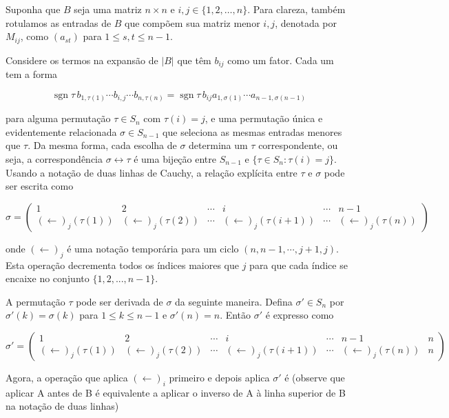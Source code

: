 
Suponha que $B$ seja uma matriz $n \times n$ e $i,j \in \{1,2,\dots ,n\}$. Para clareza, também rotulamos as entradas de $B$ que compõem sua matriz menor $i,j$, denotada por $M_{ij}$, como $(a_{st})$ para $1 \leq s,t \leq n-1$.

Considere os termos na expansão de $|B|$ que têm $b_{ij}$ como um fator. Cada um tem a forma

\[
\operatorname{sgn} \tau \, b_{1,\tau (1)}\cdots b_{i,j}\cdots b_{n,\tau (n)} = \operatorname{sgn} \tau \, b_{ij} a_{1,\sigma (1)}\cdots a_{n-1,\sigma (n-1)}
\]

para alguma permutação $\tau \in S_n$ com $\tau (i) = j$, e uma permutação única e evidentemente relacionada $\sigma \in S_{n-1}$ que seleciona as mesmas entradas menores que $\tau$. Da mesma forma, cada escolha de $\sigma$ determina um $\tau$ correspondente, ou seja, a correspondência $\sigma \leftrightarrow \tau$ é uma bijeção entre $S_{n-1}$ e $\{\tau \in S_{n}: \tau (i) = j\}$. Usando a notação de duas linhas de Cauchy, a relação explícita entre $\tau$ e $\sigma$ pode ser escrita como

\[
\sigma = \begin{pmatrix} 1 & 2 & \cdots & i & \cdots & n-1 \\ (\leftarrow )_{j}(\tau (1)) & (\leftarrow )_{j}(\tau (2)) & \cdots & (\leftarrow )_{j}(\tau (i+1)) & \cdots & (\leftarrow )_{j}(\tau (n)) \end{pmatrix}
\]

onde $(\leftarrow )_{j}$ é uma notação temporária para um ciclo $(n,n-1,\cdots ,j+1,j)$. Esta operação decrementa todos os índices maiores que $j$ para que cada índice se encaixe no conjunto $\{1,2,...,n-1\}$.

A permutação $\tau$ pode ser derivada de $\sigma$ da seguinte maneira. Defina $\sigma' \in S_{n}$ por $\sigma' (k) = \sigma (k)$ para $1 \leq k \leq n-1$ e $\sigma' (n) = n$. Então $\sigma'$ é expresso como

\[
\sigma' = \begin{pmatrix} 1 & 2 & \cdots & i & \cdots & n-1 & n \\ (\leftarrow )_{j}(\tau (1)) & (\leftarrow )_{j}(\tau (2)) & \cdots & (\leftarrow )_{j}(\tau (i+1)) & \cdots & (\leftarrow )_{j}(\tau (n)) & n \end{pmatrix}
\]

Agora, a operação que aplica $(\leftarrow )_{i}$ primeiro e depois aplica $\sigma'$ é (observe que aplicar A antes de B é equivalente a aplicar o inverso de A à linha superior de B na notação de duas linhas)

